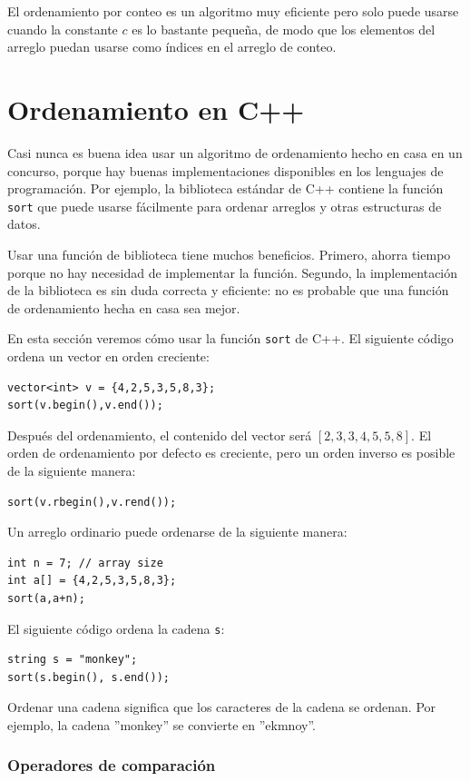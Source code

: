 El ordenamiento por conteo es un algoritmo muy eficiente
pero solo puede usarse cuando la constante $c$
es lo bastante pequeña, de modo que los elementos del arreglo puedan
usarse como índices en el arreglo de conteo.

\section{Ordenamiento en C++}


Casi nunca es buena idea usar
un algoritmo de ordenamiento hecho en casa
en un concurso, porque hay buenas
implementaciones disponibles en los lenguajes de programación.
Por ejemplo, la biblioteca estándar de C++ contiene
la función \texttt{sort} que puede usarse fácilmente para
ordenar arreglos y otras estructuras de datos.

Usar una función de biblioteca tiene muchos beneficios.
Primero, ahorra tiempo porque no hay necesidad de
implementar la función.
Segundo, la implementación de la biblioteca es
sin duda correcta y eficiente: no es probable
que una función de ordenamiento hecha en casa sea mejor.

En esta sección veremos cómo usar la
función \texttt{sort} de C++.
El siguiente código ordena
un vector en orden creciente:
\begin{lstlisting}
vector<int> v = {4,2,5,3,5,8,3};
sort(v.begin(),v.end());
\end{lstlisting}
Después del ordenamiento, el contenido del
vector será
$[2,3,3,4,5,5,8]$.
El orden de ordenamiento por defecto es creciente,
pero un orden inverso es posible de la siguiente manera:
\begin{lstlisting}
sort(v.rbegin(),v.rend());
\end{lstlisting}
Un arreglo ordinario puede ordenarse de la siguiente manera:
\begin{lstlisting}
int n = 7; // array size
int a[] = {4,2,5,3,5,8,3};
sort(a,a+n);
\end{lstlisting}
\newpage
El siguiente código ordena la cadena \texttt{s}:
\begin{lstlisting}
string s = "monkey";
sort(s.begin(), s.end());
\end{lstlisting}
Ordenar una cadena significa que los caracteres
de la cadena se ordenan.
Por ejemplo, la cadena ''monkey'' se convierte en ''ekmnoy''.

\subsubsection{Operadores de comparación}

